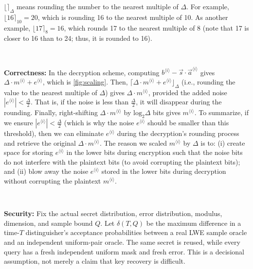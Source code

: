 $\lfloor \rceil_\Delta$ means rounding the number to the nearest multiple of $\Delta$. For example, $\lfloor 16 \rceil_{10} = 20$, which is rounding 16 to the nearest multiple of 10. As another example, $\lfloor 17 \rceil_{8} = 16$, which rounds 17 to the nearest multiple of 8 (note that 17 is closer to 16 than to 24; thus, it is rounded to 16). 


$ $

\noindent \textbf{Correctness: } In the decryption scheme, computing $b^{\langle i \rangle} - \vec{s} \cdot \vec{a}^{\langle i \rangle}$ gives $\Delta \cdot m^{\langle i \rangle}+ e^{\langle i \rangle}$, which is \autoref{fig:scaling}. Then, $\lceil \Delta \cdot m^{\langle i \rangle} + e^{\langle i \rangle} \rfloor_{\Delta}$ (i.e., rounding the value to the nearest multiple of $\Delta$) gives $\Delta \cdot m^{\langle i \rangle}$, provided the added noise $|e^{\langle i \rangle}| < \frac{\Delta}{2}$. That is, if the noise is less than $\frac{\Delta}{2}$, it will disappear during the rounding. Finally, right-shifting $\Delta \cdot m^{\langle i \rangle}$ by $\text{log}_2 \Delta$ bits gives $m^{\langle i \rangle}$. To summarize, if we ensure $|e^{\langle i \rangle}| < \frac{\Delta}{2}$ (which is why the noise $e^{\langle i \rangle}$ should be smaller than this threshold), then we can eliminate $e^{\langle i \rangle}$ during the decryption's rounding process and retrieve the original $\Delta \cdot m^{\langle i \rangle}$. The reason we scaled $m^{\langle i \rangle}$ by $\Delta$ is to: (i) create space for storing $e^{\langle i \rangle}$ in the lower bits during encryption such that the noise bits do not interfere with the plaintext bits (to avoid corrupting the plaintext bits); and (ii) blow away the noise $e^{\langle i \rangle}$ stored in the lower bits during decryption without corrupting the plaintext $m^{\langle i \rangle}$. 

$ $

\noindent \textbf{Security: } Fix the actual secret distribution, error distribution, modulus, dimension, and sample bound $Q$. Let $\delta(T,Q)$ be the maximum difference in a time-$T$ distinguisher's acceptance probabilities between a real LWE sample oracle and an independent uniform-pair oracle. The same secret is reused, while every query has a fresh independent uniform mask and fresh error. This is a decisional assumption, not merely a claim that key recovery is difficult.

